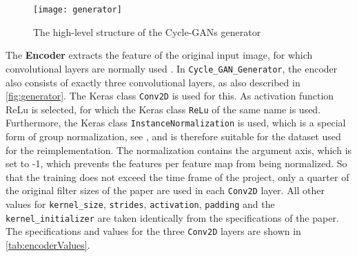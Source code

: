 \documentclass[fleqn,10pt]{SelfArx} %
\begin{document}
\begin{figure*}[htb] 
	\centering 
	\texttt{[image: generator]}
	\caption{The high-level structure of the Cycle-\ac{GAN}s generator \cite{Introduction-to-Cycle-GANs}}
	\label{fig:generator}
\end{figure*}

The \textbf{Encoder} extracts the feature of the original input image, for which convolutional layers are normally used \cite{Introduction-to-Cycle-GANs}. In \texttt{Cycle\_GAN\_Generator}, the encoder also consists of exactly three convolutional layers, as also described in \autoref{fig:generator}. The Keras class \texttt{Conv2D} is used for this. As activation function \ac{ReLu} is selected, for which the Keras class \texttt{ReLu} of the same name is used. Furthermore, the Keras class \texttt{InstanceNormalization} is used, which is a special form of group normalization, see \cite{google-tf-InstanceNormalization}, and is therefore suitable for the dataset used for the reimplementation. The normalization contains the argument axis, which is set to -1, which prevents the features per feature map from being normalized. So that the training does not exceed the time frame of the project, only a quarter of the original filter sizes of the paper are used in each \texttt{Conv2D} layer. All other values for \texttt{kernel\_size}, \texttt{strides}, \texttt{activation}, \texttt{padding} and the \texttt{kernel\_initializer} are taken identically from the specifications of the paper. The specifications and values for the three \texttt{Conv2D} layers are shown in \autoref{tab:encoderValues}.~\cite{image-to-image-ccan}
\end{document}
